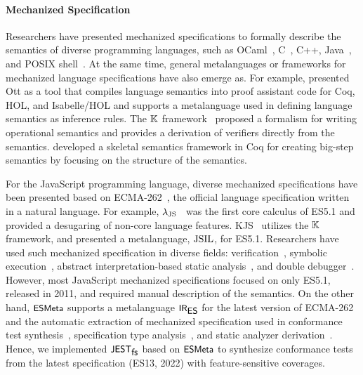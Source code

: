 
\paragraph{\textbf{Mechanized Specification}}

Researchers have presented mechanized specifications to formally describe the
semantics of diverse programming languages, such as
OCaml~\cite{ocaml-light-spec}, C~\cite{c-light-spec}, C++\cite{cpp-spec},
Java~\cite{k-java}, and POSIX shell~\cite{posix-shell-spec}.
%
At the same time, general metalanguages or frameworks for mechanized language
specifications have also emerge as.
%
For example, \citet{ott} presented Ott as a tool that compiles language
semantics into proof assistant code for Coq, HOL, and Isabelle/HOL and supports
a metalanguage used in defining language semantics as inference rules.
%
The $\mathbb{K}$ framework~\cite{kframework} proposed a formalism for writing
operational semantics and provides a derivation of verifiers directly from the
semantics.
%
\citet{skel} developed a skeletal semantics framework in Coq for creating
big-step semantics by focusing on the structure of the semantics.


For the JavaScript programming language, diverse mechanized specifications have
been presented based on ECMA-262~\cite{es13}, the official language
specification written in a natural language.
%
For example, $\lambda_\text{JS}$~\cite{lambdajs} was the first core calculus of ES5.1
and provided a desugaring of non-core language features.
%
KJS~\cite{kjs} utilizes the $\mathbb{K}$ framework, and \citet{javert}
presented a metalanguage, $\text{JSIL}$, for ES5.1.
%
Researchers have used such mechanized specification in diverse fields:
verification~\cite{javert}, symbolic execution~\cite{javert2}, abstract
interpretation-based static analysis~\cite{wala, tajs, jsai, safe, safe2}, and
double debugger~\cite{jsexplain}.
%
However, most JavaScript mechanized specifications focused on only ES5.1,
released in 2011, and required manual description of the semantics.
%
On the other hand, $\textsf{\small ESMeta}$ supports a metalanguage $\textsf{\small IR}_{\textsf{\small ES}}$ for the latest
version of ECMA-262 and the automatic extraction of mechanized specification
used in conformance test synthesis~\cite{jest}, specification type
analysis~\cite{jstar}, and static analyzer derivation~\cite{jsaver}.
%
Hence, we implemented $\textsf{\small JEST}_{\textsf{\small fs}}$ based on $\textsf{\small ESMeta}$ to synthesize conformance tests
from the latest specification (ES13, 2022) with feature-sensitive coverages.

